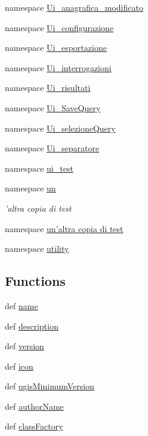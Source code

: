 \begin{DoxyCompactItemize}
\item 
namespace \hyperlink{namespacemmasgis_1_1Ui__anagrafica__modificato}{Ui\_\-anagrafica\_\-modificato}
\item 
namespace \hyperlink{namespacemmasgis_1_1Ui__configurazione}{Ui\_\-configurazione}
\item 
namespace \hyperlink{namespacemmasgis_1_1Ui__esportazione}{Ui\_\-esportazione}
\item 
namespace \hyperlink{namespacemmasgis_1_1Ui__interrogazioni}{Ui\_\-interrogazioni}
\item 
namespace \hyperlink{namespacemmasgis_1_1Ui__risultati}{Ui\_\-risultati}
\item 
namespace \hyperlink{namespacemmasgis_1_1Ui__SaveQuery}{Ui\_\-SaveQuery}
\item 
namespace \hyperlink{namespacemmasgis_1_1Ui__selezioneQuery}{Ui\_\-selezioneQuery}
\item 
namespace \hyperlink{namespacemmasgis_1_1Ui__separatore}{Ui\_\-separatore}
\item 
namespace \hyperlink{namespacemmasgis_1_1ui__test}{ui\_\-test}
\item 
namespace \hyperlink{namespacemmasgis_1_1un}{un}


\begin{DoxyCompactList}\small\item\em 'altra copia di test \item\end{DoxyCompactList}

\item 
namespace \hyperlink{namespacemmasgis_1_1un'altra_01copia_01di_01test}{un'altra copia di test}
\item 
namespace \hyperlink{namespacemmasgis_1_1utility}{utility}
\end{DoxyCompactItemize}
\subsection*{Functions}
\begin{DoxyCompactItemize}
\item 
def \hyperlink{namespacemmasgis_a144dcf13d9fc701ba4c2a40f90e51562}{name}
\item 
def \hyperlink{namespacemmasgis_aa1fb28ae7e99ef8ad6a1ca117f1a2fb8}{description}
\item 
def \hyperlink{namespacemmasgis_a51f3c32751fe698aeb28832d612bb5dd}{version}
\item 
def \hyperlink{namespacemmasgis_aedadfd2e8632646282e1ad1abdb6b0df}{icon}
\item 
def \hyperlink{namespacemmasgis_a38769dd1d38117adbfe9ddbe0352214d}{qgisMinimumVersion}
\item 
def \hyperlink{namespacemmasgis_a1aad04c3e8be8de4b6e86f5ce9bfe17a}{authorName}
\item 
def \hyperlink{namespacemmasgis_ae263473e8d399f480e8ba74ac4cf5070}{classFactory}
\end{DoxyCompactItemize}


